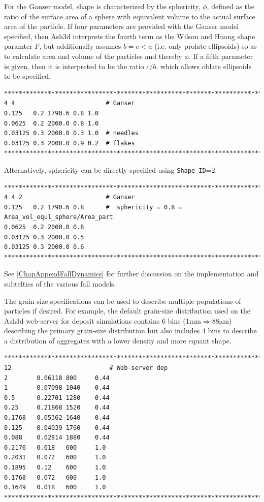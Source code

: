 \normalsize
For the Ganser model, shape is characterized by the sphericity, $\phi$, defined as the
ratio of the surface area of a sphere with equivalent volume to the actual surface area
of the particle.  If four parameters are provided with the Ganser model specified, then
Ash3d interprets the fourth term as the Wilson and Huang shape paramter $F$, but
additionally assumes $b=c<a$ (i.e. only prolate ellipsoids) so as to calculate area and
volume of the particles and thereby $\phi$.
If a fifth parameter is given, then it is interpreted to 
be the ratio $c/b$, which allows oblate ellipsoids to be specified.
\small
\begin{verbatim}
*******************************************************************************
4 4                         # Ganser
0.125   0.2 1790.6 0.8 1.0
0.0625  0.2 2000.0 0.8 1.0
0.03125 0.3 2000.0 0.3 1.0  # needles
0.03125 0.3 2000.0 0.9 0.2  # flakes
*******************************************************************************
\end{verbatim}
\normalsize
Alternatively, sphericity can be directly specified using \texttt{Shape\_ID}=2.
\small
\begin{verbatim}
*******************************************************************************
4 4 2                       # Ganser
0.125   0.2 1790.6 0.8      #  sphericity = 0.8 = Area_vol_equl_sphere/Area_part
0.0625  0.2 2000.0 0.8
0.03125 0.3 2000.0 0.5
0.03125 0.3 2000.0 0.6
*******************************************************************************
\end{verbatim}
\normalsize
See \ref{ChapAppendFallDynamics} for further discussion on the implementation and
subtelties of the various fall models.

The grain-size specifications can be used to describe multiple populations of particles
if desired.  For example, the default grain-size distribution used on the Ash3d
web-server for deposit simulations contains 6 bins
($1 \mathrm{mm} \Rightarrow 88 \mathrm{\mu m}$) describing the primary grain-size distribution
but also includes 4 bins to describe a distribution of aggregates with a lower density
and more equant shape.
\small
\begin{verbatim}
*******************************************************************************
12                           # Web-server dep
2        0.06118 800     0.44
1        0.07098 1040    0.44
0.5      0.22701 1280    0.44
0.25     0.21868 1520    0.44
0.1768   0.05362 1640    0.44
0.125    0.04039 1760    0.44
0.088    0.02814 1880    0.44
0.2176   0.018   600     1.0
0.2031   0.072   600     1.0
0.1895   0.12    600     1.0
0.1768   0.072   600     1.0
0.1649   0.018   600     1.0
*******************************************************************************
\end{verbatim}
\normalsize

